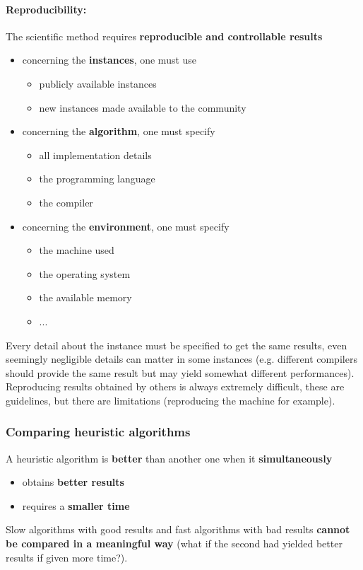 \paragraph{Reproducibility:} The scientific method requires \textbf{reproducible and controllable results}
\begin{itemize}
	\item concerning the \textbf{instances}, one must use
	\begin{itemize}
		\item publicly available instances
		\item new instances made available to the community
	\end{itemize}
	\item concerning the \textbf{algorithm}, one must specify
	\begin{itemize}
		\item all implementation details
		\item the programming language
		\item the compiler
	\end{itemize}
	\item concerning the \textbf{environment}, one must specify
	\begin{itemize}
		\item the machine used
		\item the operating system
		\item the available memory
		\item ... 
	\end{itemize}
\end{itemize}
Every detail about the instance must be specified to get the same results, even seemingly negligible details can matter in some instances (e.g. different compilers should provide the same result but may yield somewhat different performances).\\

Reproducing results obtained by others is always extremely difficult, these are guidelines, but there are limitations (reproducing the machine for example).\\

\newpage

\subsubsection{Comparing heuristic algorithms}
A heuristic algorithm is \textbf{better} than another one when it \textbf{simultaneously}
\begin{itemize}
	\item obtains \textbf{better results}
	\item requires a \textbf{smaller time}
\end{itemize}
Slow algorithms with good results and fast algorithms with bad results \textbf{cannot be compared in a meaningful way} (what if the second had yielded better results if given more time?).\\

